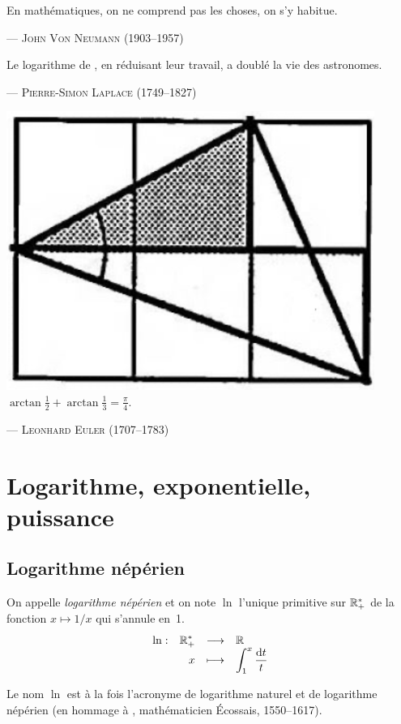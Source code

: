 \documentclass{magnolia}
\begin{document}
\setlength{}
\epigraph{\og En mathématiques, on ne comprend pas les choses, on s’y habitue.\fg}{--- \textsc{John Von Neumann (1903--1957)}}
\setlength{}
\epigraph{\og Le logarithme de , en réduisant leur travail, a doublé la vie des astronomes.\fg}{--- \textsc{Pierre-Simon Laplace (1749--1827)}}
\setlength{}
\epigraph{\includegraphics[width=0.9\textwidth]{../../Commun/Images/maths-cours-machin.png}\\
\og $\arctan\frac{1}{2}+\arctan\frac{1}{3}=\frac{\pi}{4}.$ \fg}{--- \textsc{Leonhard Euler (1707--1783)}}

\magtoc

\section{Logarithme, exponentielle, puissance}
\subsection{Logarithme népérien}
\begin{definition}[utile=-3]
On appelle \emph{logarithme népérien} et on note $\ln$ l'unique primitive sur $\mathbb{R}_+^*$ de la fonction $x\mapsto 1/x$ qui s'annule en~1.
\[\begin{array}[t]{lrcl} \displaystyle{\ln} : & \displaystyle{\mathbb{R}_+^*} & \longrightarrow & \displaystyle{\mathbb{R}} \\ & \displaystyle{x} & \longmapsto & \displaystyle{\int_{1}^{x} \frac{\text{d}t}{t}} \end{array}\]
\end{definition}

\begin{remarqueUnique}
\remarque Le nom $\ln$ est à la fois l'acronyme de logarithme naturel et de
  logarithme népérien (en hommage à , mathématicien Écossais,
  1550--1617).
\end{remarqueUnique}
\end{document}

